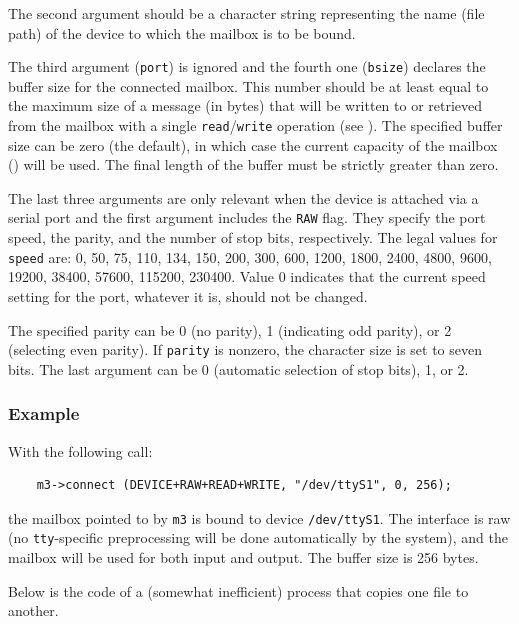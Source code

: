 The second argument should be a character string representing the
name (file path) of the device to which the mailbox is to be bound.

The third argument ({\tt port}) is ignored and the fourth one ({\tt bsize})
declares the buffer size for the connected mailbox.
This number should be at least equal to the maximum size of a message
(in bytes) that will be written to or retrieved from the mailbox with a single
{\tt read}/{\tt write} operation (see ).
The specified buffer size can be zero (the default), in which case the
current capacity of the mailbox () will be used.
The final length of the buffer must be strictly greater than zero.

The last three arguments are only relevant when the
device is attached via a serial port and the first
argument includes the {\tt RAW} flag.
They specify the port speed, the parity, and the number of stop bits,
respectively.
The legal values for {\tt speed} are:
0, 50, 75, 110, 134, 150, 200, 300, 600, 1200, 1800, 2400,
4800, 9600, 19200, 38400, 57600, 115200, 230400.
Value 0 indicates that the current speed setting for the port,
whatever it is, should not be changed.

The specified parity can be 0 (no parity), 1 (indicating odd parity), or
2 (selecting even parity).
If {\tt parity} is nonzero, the character size is set to seven bits.
The last argument can be 0 (automatic selection of stop bits), 1, or 2.

\subsubsection*{Example}

\noindent
With the following call:
\begin{verbatim}
    m3->connect (DEVICE+RAW+READ+WRITE, "/dev/ttyS1", 0, 256);
\end{verbatim}
the mailbox pointed to by {\tt m3} is bound to device
{\tt /dev/ttyS1}.
The interface is raw (no {\tt tty}-specific preprocessing will be done
automatically by the system), and the mailbox will be used for both
input and output.
The buffer size is 256 bytes.

Below is the code of a (somewhat inefficient) process that copies one
file to another.

